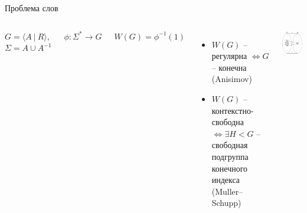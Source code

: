 \documentclass[xcolor=table]{beamer}
\begin{document}
\begin{frame}[noframenumbering]{Проблема слов}
    \begin{columns}[onlytextwidth,T]
        \column{\dimexpr\linewidth-60mm-5mm}
        $G = \langle A~|~R \rangle$, $\Sigma = A \cup A^{-1}$
        
        $\phi : \Sigma^* \to G$
        
        $W(G) = \phi^{-1}(1)$
        \newline
        \newline
        \begin{itemize}
            \item $W(G)$ -- регулярна $\iff G$ -- конечна (Anisimov)
            \item $W(G)$ -- контекстно-свободна $\iff \exists H < G$ -- свободная подгруппа конечного индекса (Muller–Schupp)
        \end{itemize}
        
        \column{60mm}
        \includegraphics[width=60mm]{pictures/3.png}
    \end{columns}
\end{frame}
\end{document}
